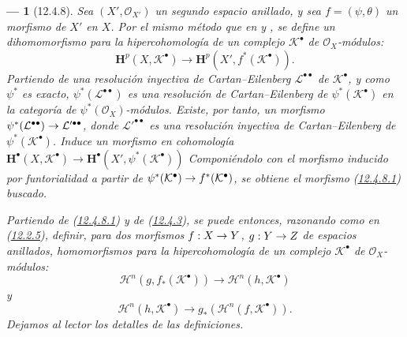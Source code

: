 \documentclass[10pt,oneside,openany]{book}
\theoremstyle{egaenv}\newtheorem*{env}{---}
\theoremstyle{egastatement}
\theoremstyle{egadescription}
\renewcommand{\to}{\mathchoice{\longrightarrow}{\rightarrow}{\rightarrow}{\rightarrow}}
\begin{document}
\begin{env}[12.4.8]
\label{0.12.4.8}
\label{0.12.4.8-fr}
Sea $(X',\mathcal O_{X'})$ un segundo espacio anillado, y sea
$f=(\psi,\theta)$ un morfismo de $X'$ en $X$.
Por el mismo método que en  y , se
define un dihomomorfismo para la hipercohomología de un complejo
$\mathcal K^\bullet$ de $\mathcal O_X$-módulos:
\begin{equation}
\label{0.12.4.8.1-fr}
\tag{12.4.8.1}
\mathbf H^p(X,\mathcal K^\bullet)
\longrightarrow\mathbf H^p(X',f^*(\mathcal K^\bullet)).
\end{equation}
Partiendo de una resolución inyectiva de Cartan--Eilenberg
$\mathcal L^{\bullet\bullet}$ de $\mathcal K^\bullet$, y como $\psi^*$ es exacto, $\psi^*(\mathcal L^{\bullet\bullet})$ es una
resolución de Cartan--Eilenberg de $\psi^*(\mathcal K^\bullet)$ en la
categoría de $\psi^*(\mathcal O_X)$-módulos.
Existe, por tanto, un morfismo
$\psi^*(\mathcal L^{\bullet\bullet})\to
\mathcal L'^{\bullet\bullet}$,
donde $\mathcal L'^{\bullet\bullet}$ es una resolución inyectiva de
Cartan--Eilenberg de $\psi^*(\mathcal K^\bullet)$.
Induce un morfismo en cohomología
$\mathbf H^\bullet(X,\mathcal K^\bullet)\longrightarrow\mathbf H^\bullet(X',\psi^*(\mathcal K^\bullet))$
Componiéndolo con el morfismo inducido por funtorialidad a partir de
$\psi^*(\mathcal K^\bullet)\to f^*(\mathcal K^\bullet)$, se obtiene el morfismo (\hyperref[0.12.4.8.1-fr]{12.4.8.1}) buscado.

Partiendo de (\hyperref[0.12.4.8.1-fr]{12.4.8.1}) y de (\hyperref[0.12.4.3-fr]{12.4.3}), se puede entonces, razonando como en (\hyperref[0.12.2.5-fr]{12.2.5}), definir, para dos morfismos $f:X\to Y$, $g:Y\to Z$ de espacios anillados, homomorfismos para la hipercohomología de un complejo $\mathcal K^\bullet$ de $\mathcal O_X$-módulos:
\begin{equation}
\label{0.12.4.8.2-fr}
\tag{12.4.8.2}
\mathscr H^n(g,f_*(\mathcal K^\bullet))
\longrightarrow\mathscr H^n(h,\mathcal K^\bullet)
\end{equation}
y
\begin{equation}
\label{0.12.4.8.3-fr}
\tag{12.4.8.3}
\mathscr H^n(h,\mathcal K^\bullet)
\longrightarrow g_*(\mathscr H^n(f,\mathcal K^\bullet)).
\end{equation}
Dejamos al lector los detalles de las definiciones.
\end{env}



\end{document}
